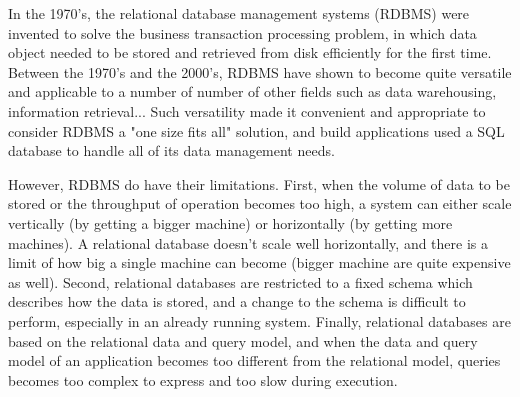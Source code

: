 
In the 1970's, the relational database management systems (RDBMS) were invented to solve the business transaction processing problem, in which data object needed to be stored and retrieved from disk efficiently for the first time. %
Between the 1970's and the 2000's, RDBMS have shown to become quite versatile and applicable to a number of number of other fields such as data warehousing, information retrieval... Such versatility made it convenient and appropriate to consider RDBMS a "one size fits all" solution, and build applications used a SQL database to handle all of its data management needs.

However, RDBMS do have their limitations. First, when the volume of data to be stored or the throughput of operation becomes too high, a system can either scale vertically (by getting a bigger machine) or horizontally (by getting more machines). A relational database doesn't scale well horizontally, and there is a limit of how big a single machine can become (bigger machine are quite expensive as well). Second, relational databases are restricted to a fixed schema which describes how the data is stored, and a change to the schema is difficult to perform, especially in an already running system. Finally, relational databases are based on the relational data and query model, and when the data and query model of an application becomes too different from the relational model, queries becomes too complex to express and too slow during execution.

